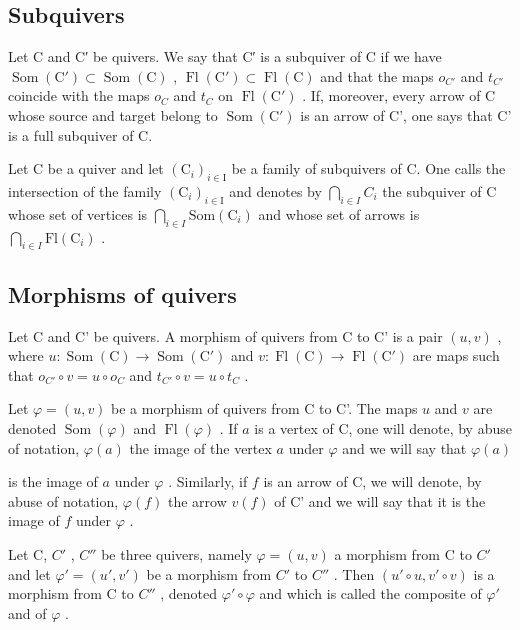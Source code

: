\subsection{Subquivers}

Let C and C′ be quivers. We say that C′ is a subquiver of C if we have \(\operatorname{Som}(\mathrm{C}') \subset \operatorname{Som}(\mathrm{C})\) , \(\operatorname{Fl}(\mathrm{C}') \subset \operatorname{Fl}(\mathrm{C})\) and that the maps \(o_{C'}\) and \(t_{C'}\) coincide with the maps \(o_{C}\) and \(t_{C}\) on \(\operatorname{Fl}(\mathrm{C}')\) . If, moreover, every arrow of C whose source and target belong to \(\operatorname{Som}(\mathrm{C}')\) is an arrow of C', one says that C' is a full subquiver of C.

Let C be a quiver and let \((\mathrm{C}_{i})_{i\in\mathrm{I}}\) be a family of subquivers of C. One calls the intersection of the family \((\mathrm{C}_{i})_{i\in\mathrm{I}}\) and denotes by \(\bigcap_{i\in I}C_{i}\) the subquiver of C whose set of vertices is \(\bigcap_{i\in I}\mathrm{Som}(\mathrm{C}_{i})\) and whose set of arrows is \(\bigcap_{i\in I}\mathrm{Fl}(\mathrm{C}_{i})\) .

\subsection{Morphisms of quivers}

Let C and C' be quivers. A morphism of quivers from C to C' is a pair \((u,v)\) , where \(u\colon\operatorname{Som}(\mathrm{C})\to\operatorname{Som}(\mathrm{C}')\) and \(v\colon\operatorname{Fl}(\mathrm{C})\to\operatorname{Fl}(\mathrm{C}')\) are maps such that \(o_{C'}\circ v=u\circ o_{C}\) and \(t_{C'}\circ v=u\circ t_{C}\) .

Let \(\varphi = (u, v)\) be a morphism of quivers from C to C'. The maps \(u\) and \(v\) are denoted \(\operatorname{Som}(\varphi)\) and \(\operatorname{Fl}(\varphi)\) . If \(a\) is a vertex of C, one will denote, by abuse of notation, \(\varphi(a)\) the image of the vertex \(a\) under \(\varphi\) and we will say that \(\varphi(a)\)

is the image of \(a\) under \(\varphi\) . Similarly, if \(f\) is an arrow of C, we will denote, by abuse of notation, \(\varphi(f)\) the arrow \(v(f)\) of C' and we will say that it is the image of \(f\) under \(\varphi\) .

Let C, \(C'\) , \(C''\) be three quivers, namely \(\varphi = (u, v)\) a morphism from C to \(C'\) and let \(\varphi' = (u', v')\) be a morphism from \(C'\) to \(C''\) . Then \((u' \circ u, v' \circ v)\) is a morphism from C to \(C''\) , denoted \(\varphi' \circ \varphi\) and which is called the composite of \(\varphi'\) and of \(\varphi\) .

